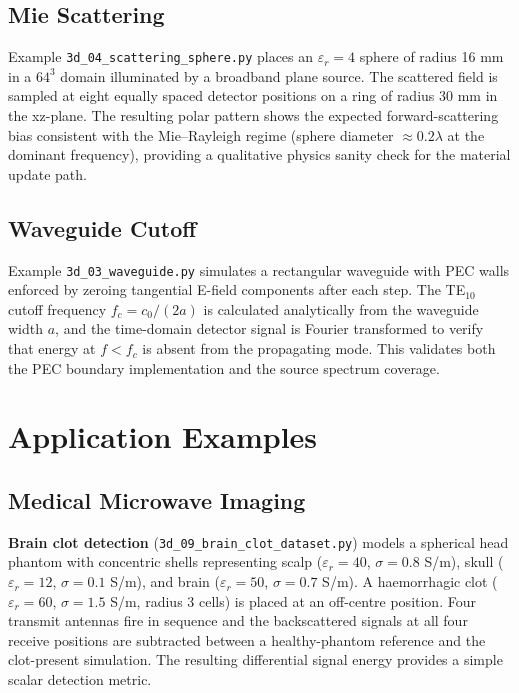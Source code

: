 \documentclass[10pt,twocolumn]{article}
\begin{document}
\subsection{Mie Scattering}

Example \texttt{3d\_04\_scattering\_sphere.py} places an $\varepsilon_r = 4$
sphere of radius 16 mm in a $64^3$ domain illuminated by a broadband plane
source. The scattered field is sampled at eight equally spaced detector
positions on a ring of radius 30 mm in the xz-plane. The resulting polar
pattern shows the expected forward-scattering bias consistent with the
Mie--Rayleigh regime (sphere diameter $\approx 0.2\lambda$ at the dominant
frequency), providing a qualitative physics sanity check for the material
update path.

\subsection{Waveguide Cutoff}

Example \texttt{3d\_03\_waveguide.py} simulates a rectangular waveguide with
PEC walls enforced by zeroing tangential E-field components after each step.
The TE$_{10}$ cutoff frequency $f_c = c_0 / (2a)$ is calculated analytically
from the waveguide width $a$, and the time-domain detector signal is Fourier
transformed to verify that energy at $f < f_c$ is absent from the propagating
mode. This validates both the PEC boundary implementation and the source
spectrum coverage.

\section{Application Examples}
\label{sec:examples}

\subsection{Medical Microwave Imaging}

\textbf{Brain clot detection} (\texttt{3d\_09\_brain\_clot\_dataset.py}) models
a spherical head phantom with concentric shells representing scalp
($\varepsilon_r = 40$, $\sigma = 0.8$ S/m), skull ($\varepsilon_r = 12$,
$\sigma = 0.1$ S/m), and brain ($\varepsilon_r = 50$, $\sigma = 0.7$ S/m).
A haemorrhagic clot ($\varepsilon_r = 60$, $\sigma = 1.5$ S/m, radius 3 cells)
is placed at an off-centre position. Four transmit antennas fire in sequence
and the backscattered signals at all four receive positions are subtracted
between a healthy-phantom reference and the clot-present simulation. The
resulting differential signal energy provides a simple scalar detection metric.
\end{document}
